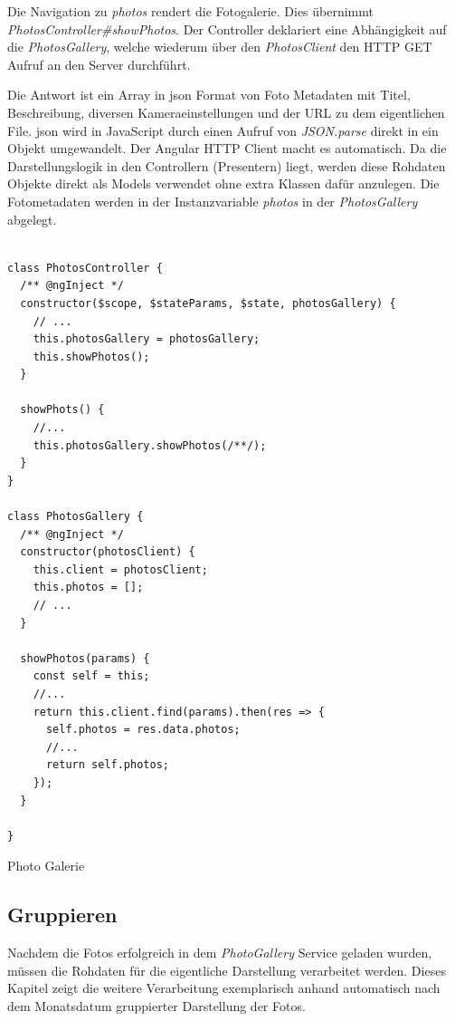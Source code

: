 Die Navigation zu \textit{\/photos} rendert die Fotogalerie. Dies übernimmt  \textit{PhotosController\#showPhotos}. Der Controller deklariert eine Abhängigkeit auf die \textit{PhotosGallery}, welche wiederum über den \textit{PhotosClient} den HTTP GET Aufruf an den Server durchführt.

Die Antwort ist ein Array in \gls{json} Format von Foto Metadaten mit Titel, Beschreibung, diversen Kameraeinstellungen und der URL zu dem eigentlichen File. \gls{json} wird in JavaScript durch einen Aufruf von \textit{JSON.parse} direkt in ein Objekt umgewandelt. Der Angular HTTP Client macht es automatisch. Da die Darstellungslogik in den Controllern (Presentern) liegt, werden diese Rohdaten Objekte direkt als Models verwendet ohne extra Klassen dafür anzulegen. Die Fotometadaten werden in der Instanzvariable \textit{photos} in der \textit{PhotosGallery} abgelegt.


\begin{listing}[H]
\begin{verbatim}

class PhotosController {
  /** @ngInject */
  constructor($scope, $stateParams, $state, photosGallery) {
    // ...
    this.photosGallery = photosGallery;
    this.showPhotos();
  }

  showPhots() {
    //...
    this.photosGallery.showPhotos(/**/);
  }
}

class PhotosGallery {
  /** @ngInject */
  constructor(photosClient) {
    this.client = photosClient;
    this.photos = [];
    // ...
  }

  showPhotos(params) {
    const self = this;
    //...
    return this.client.find(params).then(res => {
      self.photos = res.data.photos;
      //...
      return self.photos;
    });
  }

}

\end{verbatim}
\caption{Photo Galerie}
\label{lst:photo_gallery}
\end{listing}

\subsection{Gruppieren}

Nachdem die Fotos erfolgreich in dem \textit{PhotoGallery} Service geladen wurden, müssen die Rohdaten für die eigentliche Darstellung verarbeitet werden. Dieses Kapitel zeigt die weitere Verarbeitung exemplarisch anhand automatisch nach dem Monatsdatum gruppierter Darstellung der Fotos.

